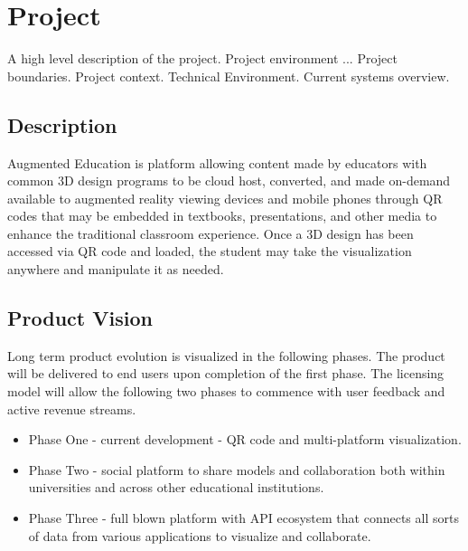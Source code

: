 \section{Project}
A high level description of the project.  Project environment ...
Project boundaries.
Project context.
Technical Environment.
Current systems overview.


\subsection{Description}
Augmented Education is platform allowing content made by educators with common 3D design programs to be cloud host, converted, and made on-demand available to augmented reality viewing devices and mobile phones through QR codes that may be embedded in textbooks, presentations, and other media to enhance the traditional classroom experience. Once a 3D design has been accessed via QR code and loaded, the student may take the visualization anywhere and manipulate it as needed.   

\subsection{Product Vision}
Long term product evolution is visualized in the following phases. The product will be delivered to end users upon completion of the first phase. The licensing model will allow the following two phases to commence with user feedback and active revenue streams. 

\begin{itemize}
\item Phase One - current development - QR code and multi-platform visualization.
\item Phase Two - social platform to share models and collaboration both within universities and across other educational institutions.
\item Phase Three - full blown platform with API ecosystem that connects all sorts of data from various applications to visualize and collaborate.
\end{itemize}

